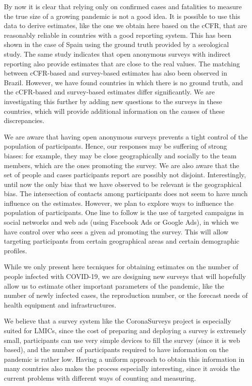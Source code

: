 \documentclass{article}
\begin{document}
By now it is clear that relying only on confirmed cases and fatalities to measure the true size of a growing pandemic is not a good idea. It is possible to use this data to derive estimates, like the one we obtain here based on the cCFR, that are
reasonably reliable in countries with a good reporting system. This has been shown in the case of Spain using the ground
truth provided by a serological study. The same study indicates that open anonymous surveys with indirect reporting also provide estimates that are close to the real values. The matching between cCFR-based and survey-based estimates has also been observed in Brazil. However, we have found countries in which there is no ground truth, and the cCFR-based and survey-based estimates differ significantly. We are investigating this further by adding new questions to the surveys in these countries,
which will provide additional information on the causes of these discrepancies.

We are aware that having open anonymous surveys prevents a tight control of the population of participants. Hence, our responses may be suffering of strong biases: for example, they may be close geographically and socially to the team members, which are the ones promoting the survey. We are also aware that the set of people and cases participants report are possibly not disjoint. Interestingly, until now the only bias that we have observed to be relevant is the geographical bias. The intersection of contacts among participants does not seem to have much influence on the estimates.
%
However, we plan to explore ways to influence the population of participants. One line to follow is the use of targeted campaigns in social networks and web ads (using Facebook Ads or Google Ads), in which we have control over who sees a given ad promoting the survey. This will allow targeting participants from certain geographical areas and certain demographic profiles.

While we only present here tecniques for obtaining estimates on the number of people infected with COVID-19, we are designing new surveys that will hopefully allow us to estimate other important parameters of the pandemic, like the number of newly infected cases, the reproduction number, or the forecast needs of health equipment and infrastructures.

We believe that a survey system like the CoronaSurveys project is especially suited for LMICs, since the cost of preparing and deploying a survey is extremely small, participants can use very simple devices to fill the survey (since it is web based), and the number of participants required to have information on the pandemic is rather low. Having a uniform approach to obtain this information in many countries also makes the process especially interesting, since it avoids the current problems with different ways of counting and measuring. 
\end{document}
